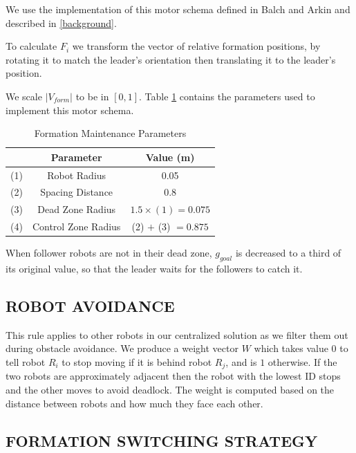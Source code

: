 \documentclass[letterpaper, 10 pt, conference]{ieeeconf}  %
\begin{document}
We use the implementation of this motor schema defined in Balch and Arkin and described in \ref{background}. 

To calculate $F_i$ we transform the vector of relative formation positions, by rotating it to match the leader's orientation then translating it to the leader's position.

We scale $\lvert V_{form}\rvert$ to be in $[0, 1]$. Table \ref{table_formation} contains the parameters used to implement this motor schema.

\begin{table}[h]
\caption{Formation Maintenance Parameters}
\label{table_formation}
\begin{center}
\begin{tabular}{|c|c|c|}
\hline
& Parameter & Value (m) \\
\hline
(1) & Robot Radius             & 0.05 \\
(2) & Spacing Distance        & 0.8 \\
(3) & Dead Zone Radius      & $1.5 \times (1) = 0.075$ \\
(4) & Control Zone Radius    & (2) $+$ (3) $=0.875$ \\
\hline
\end{tabular}
\end{center}
\end{table}

When follower robots are not in their dead zone, $g_{goal}$ is decreased to a third of its original value, so that the leader waits for the followers to catch it.

\subsection{ROBOT AVOIDANCE}

This rule applies to other robots in our centralized solution as we filter them out during obstacle avoidance. We produce a weight vector $W$ which takes value $0$ to tell robot $R_i$ to stop moving if it is behind robot $R_j$, and is $1$ otherwise. If the two robots are approximately adjacent then the robot with the lowest ID stops and the other moves to avoid deadlock. The weight is computed based on the distance between robots and how much they face each other.

\subsection{FORMATION SWITCHING STRATEGY}
\end{document}
